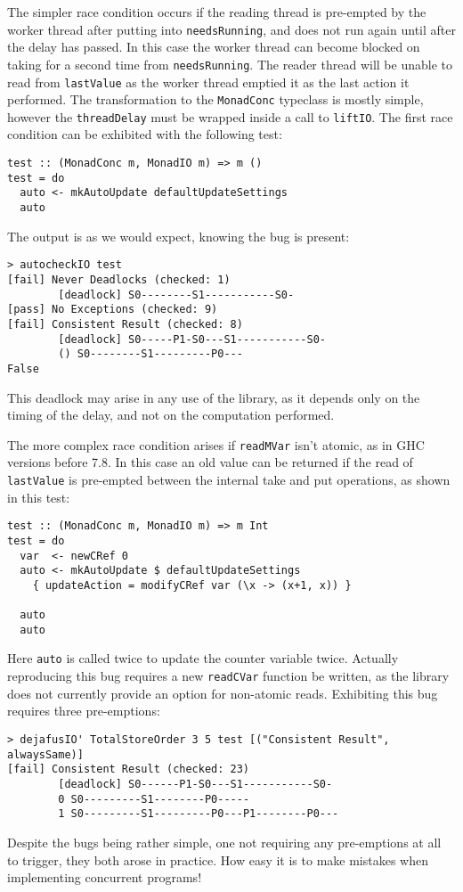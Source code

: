 The simpler race condition occurs if the reading thread is pre-empted
by the worker thread after putting into \verb|needsRunning|, and does
not run again until after the delay has passed. In this case the
worker thread can become blocked on taking for a second time from
\verb|needsRunning|. The reader thread will be unable to read from
\verb|lastValue| as the worker thread emptied it as the last action it
performed. The transformation to the \verb|MonadConc| typeclass is
mostly simple, however the \verb|threadDelay| must be wrapped inside a
call to \verb|liftIO|. The first race condition can be exhibited with
the following test:

\begin{verbatim}
test :: (MonadConc m, MonadIO m) => m ()
test = do
  auto <- mkAutoUpdate defaultUpdateSettings
  auto
\end{verbatim}

The output is as we would expect, knowing the bug is present:

\begin{verbatim}
> autocheckIO test
[fail] Never Deadlocks (checked: 1)
        [deadlock] S0--------S1-----------S0-
[pass] No Exceptions (checked: 9)
[fail] Consistent Result (checked: 8)
        [deadlock] S0-----P1-S0---S1-----------S0-
        () S0--------S1---------P0---
False
\end{verbatim}

This deadlock may arise in any use of the library, as it depends only
on the timing of the delay, and not on the computation performed.

The more complex race condition arises if \verb|readMVar| isn't
atomic, as in GHC versions before 7.8. In this case an old value can
be returned if the read of \verb|lastValue| is pre-empted between the
internal take and put operations, as shown in this test:

\begin{verbatim}
test :: (MonadConc m, MonadIO m) => m Int
test = do
  var  <- newCRef 0
  auto <- mkAutoUpdate $ defaultUpdateSettings
    { updateAction = modifyCRef var (\x -> (x+1, x)) }

  auto
  auto
\end{verbatim}

Here \verb|auto| is called twice to update the counter variable
twice. Actually reproducing this bug requires a new \verb|readCVar|
function be written, as the library does not currently provide an
option for non-atomic reads. Exhibiting this bug requires three
pre-emptions:

\begin{verbatim}
> dejafusIO' TotalStoreOrder 3 5 test [("Consistent Result", alwaysSame)]
[fail] Consistent Result (checked: 23)
        [deadlock] S0------P1-S0---S1-----------S0-
        0 S0---------S1--------P0-----
        1 S0---------S1---------P0---P1--------P0---
\end{verbatim}

Despite the bugs being rather simple, one not requiring any
pre-emptions at all to trigger, they both arose in practice. How easy
it is to make mistakes when implementing concurrent programs!
